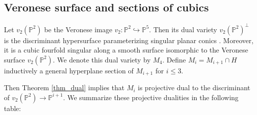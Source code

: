 \documentclass[12pt]{amsart}
\newtheorem{example}[theorem]{Example}
\begin{document}
   

\subsection{Veronese surface and sections of cubics} \label{sec_Veronese-surface}

 Let $v_2(\mathbb P^2)$ be the Veronese image $v_2:\mathbb P^2\hookrightarrow \mathbb P^5$. Then its dual variety $v_2(\mathbb P^2)^{\perp}$ is the discriminant hypersurface parameterizing singular planar conics \cite[Sec. 2.1.1]{Dolgachev-classicalAG}. Moreover, it is a cubic fourfold singular along a smooth surface isomorphic to the Veronese surface $v_2(\mathbb P^2)$. We denote this dual variety by $M_4$. Define $M_i=M_{i+1}\cap H$ inductively a general hyperplane section of $M_{i+1}$ for $i\le 3$. 
 
 Then Theorem \ref{thm_dual} implies that $M_i$ is projective dual to the discriminant of $v_2(\mathbb P^2)\to \mathbb P^{i+1}$. We summarize these projective dualities in the following table:
 
   
    
   
    
  
\end{document}
